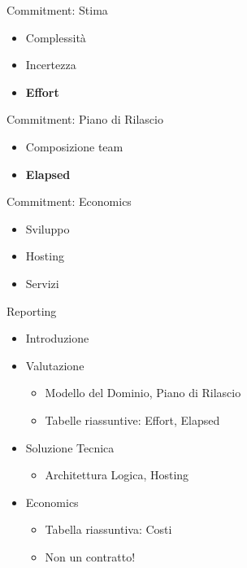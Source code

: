\documentclass[compress, red, 14pt]{beamer}
\begin{document}
	\begin{frame}{Commitment: Stima}
		\begin{itemize}
			\item Complessità
			\item Incertezza
		\end{itemize}

		\begin{itemize}
			\item \textbf{Effort}
		\end{itemize}
	\end{frame}

	\begin{frame}{Commitment: Piano di Rilascio}
		\begin{itemize}
			\item Composizione team
		\end{itemize}

		\begin{itemize}
			\item \textbf{Elapsed}
		\end{itemize}
	\end{frame}
	
	\begin{frame}{Commitment: Economics}
		\begin{itemize}
			\item Sviluppo
			\item Hosting
			\item Servizi
		\end{itemize}

	\end{frame}
	
	\begin{frame}{Reporting}
		\begin{itemize}
			\item Introduzione
			\item Valutazione
			\begin{itemize}
				\item Modello del Dominio, Piano di Rilascio
				\item Tabelle riassuntive: Effort, Elapsed
			\end{itemize}
			\item Soluzione Tecnica
			\begin{itemize}
				\item Architettura Logica, Hosting
			\end{itemize}
			\item Economics
			\begin{itemize}
				\item Tabella riassuntiva: Costi
				\item Non un contratto!
			\end{itemize}
		\end{itemize}
	\end{frame}
	
\end{document}
